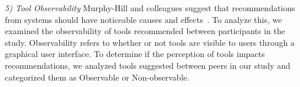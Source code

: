 
\textit{5) Tool Observability} Murphy-Hill and colleagues suggest that recommendations from 
systems should have noticeable causes and effects~\cite{Murphy-Hill2015HowDoUsers}. 
To analyze this, we examined the observability of tools recommended between participants in the study. Observability refers to whether or not tools are visible to users through a graphical user interface. To determine if the perception of tools impacts recommendations, we analyzed tools suggested between peers in our study and categorized them as Observable or Non-observable. 

